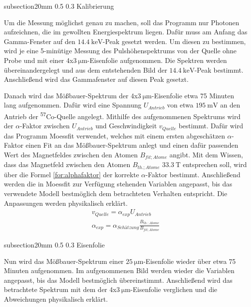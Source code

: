 \documentclass[german, %
parskip=full, %
bibliography=totoc, %
]{scrartcl}
\makeatletter
\renewcommand\subsection{\@startsection 
   {subsection}{2}{0mm}%
   {0.5\baselineskip}%
   {0.3\baselineskip}%
   {\bfseries\sffamily\large}%
   }
\makeatother
\begin{document}
\subsection{Kalibrierung}

Um die Messung möglichst genau zu machen, soll das Programm nur Photonen aufzeichnen, die im gewollten Energiespektrum liegen. Dafür muss am Anfang das Gamma-Fenster auf den \(\SI{14.4}{\kilo\electronvolt}\)-Peak gesetzt werden. Um diesen zu bestimmen, wird je eine 5-minütige Messung des Pulshöhenspektrums von der Quelle ohne Probe und mit einer 4x\(\SI{3}{\micro\meter}\)-Eisenfolie aufgenommen. Die Spektren werden übereinandergelegt und aus dem entstehenden Bild der \(\SI{14.4}{\kilo\electronvolt}\)-Peak bestimmt. Anschließend wird das Gammafenster auf diesen Peak gesetzt.

Danach wird das Mößbauer-Spektrum der 4x\(\SI{3}{\micro\meter}\)-Eisenfolie etwa 75 Minuten lang aufgenommen. Dafür wird eine Spannung $U_{Antrieb}$ von etwa \(\SI{195}{\milli\volt}\) an den Antrieb der \textsuperscript{57}Co-Quelle angelegt. Mithilfe des aufgenommenen Spektrums wird der $\alpha$-Faktor zwischen $U_{Antrieb}$ und Geschwindigkeit $v_{Quelle}$ bestimmt. Dafür wird das Programm Moessfit verwendet, welches mit einem ersten abgeschätzen $\alpha$-Faktor einen Fit an das Mößbauer-Spektrum anlegt und einen dafür passenden Wert des Magnetfeldes zwischen den Atomen $B_{fit;Atome}$ angibt. Mit dem Wissen, dass das Magnetfeld zwischen den Atomen $B_{th.;Atome}$ \(\SI{33.3}{\tesla}\) entsprechen soll, wird über die Formel \ref{for:alphafaktor} der korrekte $\alpha$-Faktor bestimmt. Anschließend werden die in Moessfit zur Verfügung stehenden Variablen angepasst, bis das verwendete Modell bestmöglich dem betrachteten Verhalten entspricht. Die Anpassungen werden physikalisch erklärt.
\begin{align}
v_{Quelle} = \alpha_{exp} U_{Antrieb} \\
\alpha_{exp} = \alpha_{Schätzung} \frac{B_{th.;Atome}}{B_{fit;Atome}} \label{for:alphafaktor}
\end{align}

\subsection{Eisenfolie}

Nun wird das Mößbauer-Spektrum einer \(\SI{25}{\micro\meter}\)-Eisenfolie wieder über etwa 75 Minuten aufgenommen. Im aufgenommenen Bild werden wieder die Variablen angepasst, bis das Modell bestmöglich übereinstimmt. Anschließend wird das betrachtete Spektrum mit dem der 4x\(\SI{3}{\micro\meter}\)-Eisenfolie verglichen und die Abweichungen physikalisch erklärt.
\end{document}
